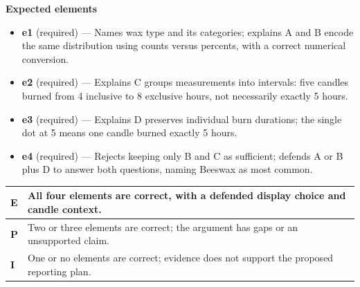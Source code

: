 \documentclass[11pt]{article}
\begin{document}

\textbf{Expected elements}
\begin{itemize}[leftmargin=1.5em,itemsep=2pt,topsep=2pt]
  \item \textbf{e1} (required) --- Names wax type and its categories; explains A and B encode the same distribution using counts versus percents, with a correct numerical conversion.
  \item \textbf{e2} (required) --- Explains C groups measurements into intervals: five candles burned from 4 inclusive to 8 exclusive hours, not necessarily exactly 5 hours.
  \item \textbf{e3} (required) --- Explains D preserves individual burn durations; the single dot at 5 means one candle burned exactly 5 hours.
  \item \textbf{e4} (required) --- Rejects keeping only B and C as sufficient; defends A or B plus D to answer both questions, naming Beeswax as most common.
\end{itemize}

{\small\renewcommand{\arraystretch}{1.25}
\noindent\begin{tabular}{|p{0.5in}|p{5.9in}|}
\hline
\textbf{E} & All four elements are correct, with a defended display choice and candle context. \\ \hline
\textbf{P} & Two or three elements are correct; the argument has gaps or an unsupported claim. \\ \hline
\textbf{I} & One or no elements are correct; evidence does not support the proposed reporting plan. \\ \hline
\end{tabular}}

\clearpage
\normalsize
{}
\end{document}

